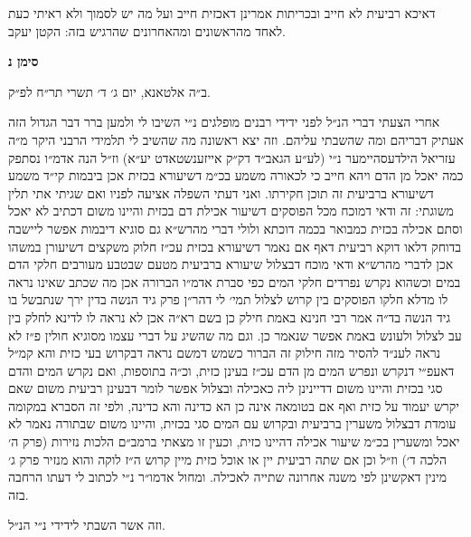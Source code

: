 \documentclass[12pt, openany]{book}
\newcommand{\chapname}{}
\newcommand{\newchap}[1]{
	\addcontentsline{toc}{chapter}{#1}
	\renewcommand{\chapname}{#1}
		\begin{center}
			\textbf{%
\fontsize{16pt}{16pt}\selectfont
				#1}
		\end{center}
}
\begin{document}
\begin{multicols}{2}
דאיכא רביעית לא חייב ובכריתות אמרינן דאכזית חייב ועל מה יש לסמוך ולא ראיתי כעת לאחד מהראשונים ומהאחרונים שהרגיש בזה: הקטן יעקב.\\\vspace{0pt}

\end{multicols}\newpage

\newchap{סימן נ}
\begin{multicols}{2}
ב״ה אלטאנא, יום ג׳ ד׳ תשרי תר״ח לפ״ק.\\\vspace{0pt}

אחרי הצעתי דברי הנ״ל לפני ידידי רבנים מופלגים נ״י השיבו לי ולמען ברר דבר הגדול הזה אעתיק דבריהם ומה שהשבתי עליהם. וזה יצא ראשונה מה שהשיב לי תלמידי הרבני היקר מ״ה עזריאל הילדעסהיימער נ״י (לע״ע הגאב״ד דק״ק אייזענשטאדט יע״א) וז״ל הנה אדמ״ו נסתפק כמה יאכל מן הדם ויהא חייב כי לכאורה משמע בכ״מ דשיעורא בכזית אכן ביבמות קי״ד משמע דשיעורא ברביעית זה תוכן חקירתו. ואני דעתי השפלה אציעה לפניו ואם שגיתי אתי תלין משוגתי: זה ודאי דמוכח מכל הפוסקים דשיעור אכילת דם בכזית והיינו משום דכתיב לא יאכל וסתם אכילה בכזית כמבואר בכמה דוכתא ולולי דברי מהרש״א גם סוגיא דיבמות אפשר ליישבה בדוחק דלאו דוקא רביעית דאף אם נאמר דשיעורא בכזית עכ״ז חלוק משקצים דשיעורן במשהו אכן לדברי מהרש״א ודאי מוכח דבצלול שיעורא ברביעית מטעם שבטבע מעורבים חלקי הדם במים וכשהוא נקרש נפרדים חלקי המים כפי סברת אדמ״ו הברורה אכן מה שכתב שאינו נראה לו מדלא חלקו הפוסקים בין קרוש לצלול תמי׳ לי דהר״ן פרק גיד הנשה בדין ירך שנתבשל בו גיד הנשה בד״ה אמר רבי חנינא באמת חילק כן בשם רא״ה אכן לא נראה לו לדינא לחלק בין עב לצלול ולעונש באמת אפשר שנאמר כן. וגם מה שהשיג על דברי עצמו מסוגיא חולין פ״ז לא נראה לענ״ד להסיר מזה חילוק זה הברור כשמש דמשם נראה דבקרוש בעי כזית והא קמ״ל דאעפ״י דנקרש ונפרש המים מן הדם עכ״ז בעינן כזית, וכ״ה בתוספות, ואם נקרש המים והדם סגי בכזית והיינו משום דדיינינן ליה כאכילה ובצלול אפשר לומר דבעינן רביעית משום שאם יקרש יעמוד על כזית ואף אם בטומאה אינה כן הא כדינה והא כדינה, ולפי זה הסברא במקומה עומדת דבצלול משערין ברביעית ובקרוש עם המים סגי בכזית, והיינו משום שבתורה נאמר לא יאכל ומשערין בכ״מ שיעור אכילה דהיינו כזית, וכעין זו מצאתי ברמב״ם הלכות נזירות (פרק ה׳ הלכה ד׳) וז״ל וכן אם שתה רביעית יין או אוכל כזית מיין קרוש ה״ז לוקה והוא מנזיר פרק ג׳ מינין דאקשינן לפי משנה אחרונה שתייה לאכילה. ומחול אדמו״ר נ״י לכתוב לי דעתו הרחבה בזה.\\\vspace{0pt}

וזה אשר השבתי לידידי נ״י הנ״ל.\\\vspace{0pt}


\end{multicols}
\end{document}
